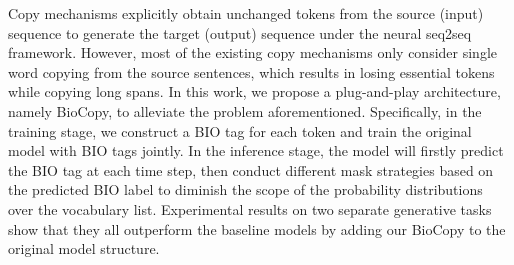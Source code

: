 Copy mechanisms explicitly obtain unchanged tokens from the source (input) sequence to generate the target (output) sequence under the neural seq2seq framework. However, most of the existing copy mechanisms only consider single word copying from the source sentences, which results in losing essential tokens while copying long spans. In this work, we propose a plug-and-play architecture, namely BioCopy, to alleviate the problem aforementioned. Specifically, in the training stage, we construct a BIO tag for each token and train the original model with BIO tags jointly. In the inference stage, the model will firstly predict the BIO tag at each time step, then conduct different mask strategies based on the predicted BIO label to diminish the scope of the probability distributions over the vocabulary list. Experimental results on two separate generative tasks show that they all outperform the baseline models by adding our BioCopy to the original model structure.

